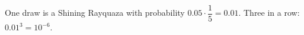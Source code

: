 One draw is a Shining Rayquaza with probability $0.05\cdot\dfrac15=0.01$. Three in a row: $0.01^3=\boxed{10^{-6}}$.
